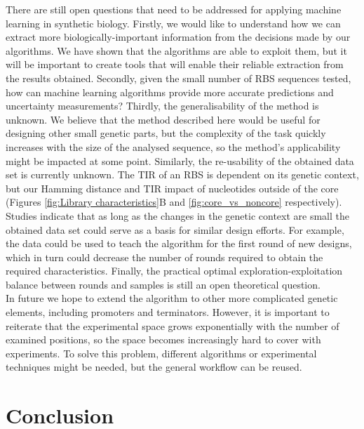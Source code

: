 \documentclass{article}
\begin{document}
There are still open questions that need to be addressed for applying machine learning in synthetic biology.
Firstly, we would like to understand how we can extract more biologically-important information from the decisions made by our algorithms.
We have shown that the algorithms are able to exploit them, but it will be important to create tools that will enable their reliable extraction from the results obtained.
Secondly, given the small number of RBS sequences tested, how can machine learning algorithms provide more accurate predictions and uncertainty measurements?
Thirdly, the generalisability of the method is unknown.
We believe that the method described here would be useful for designing other small genetic parts, but the complexity of the task quickly increases with the size of the analysed sequence, so the method's applicability might be impacted at some point.
Similarly, the re-usability of the obtained data set is currently unknown.
The TIR of an RBS is dependent on its genetic context, but our Hamming distance and TIR impact of nucleotides outside of the core (Figures \ref{fig:Library characteristics}B and \ref{fig:core_vs_noncore} respectively).
Studies indicate that as long as the changes in the genetic context are small the obtained data set could serve as a basis for similar design efforts.
For example, the data could be used to teach the algorithm for the first round of new designs, which in turn could decrease the number of rounds required to obtain the required characteristics.
Finally, the practical optimal exploration-exploitation balance between rounds and samples is still an open theoretical question.
\\

In future we hope to extend the algorithm to other more complicated genetic elements, including promoters and terminators.
However, it is important to reiterate that the experimental space grows exponentially with the number of examined positions, so the space becomes increasingly hard to cover with experiments.
To solve this problem, different algorithms or experimental techniques might be needed, but the general workflow can be reused.\\

\section{Conclusion}
\end{document}
